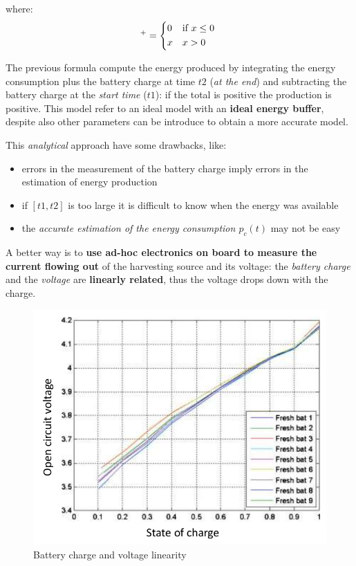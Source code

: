 \documentclass[10pt,a4paper]{report}
\theoremstyle{definition}
\begin{document}
where:
\begin{equation}
	[x]^{+} =
	\begin{cases*}
		0 & if $x \leq 0$ \\
		x        & $x > 0$
	\end{cases*}
\end{equation}

The previous formula compute the energy produced by integrating the energy consumption plus the battery charge at time $t2$ (\textit{at the end}) and subtracting the battery charge at the \textit{start time} ($t1$): if the total is positive the production is positive.
This model refer to an ideal model with an \textbf{ideal energy buffer}, despite also other parameters can be introduce to obtain a more  accurate model.

This \textit{analytical} approach have some drawbacks, like:
\begin{itemize}
	\item 
	errors in the measurement of the battery charge imply errors in the estimation of energy production
	\item 
	if $[t1,t2]$ is too large it is difficult to know when the energy was available
	\item 
	the \textit{accurate estimation of the energy consumption $p_{c}(t)$} may not be easy
\end{itemize}

A better way is to \textbf{use ad-hoc electronics on board to measure the current flowing out} of the harvesting source and its voltage: the \textit{battery charge} and the \textit{voltage} are \textbf{linearly related}, thus the voltage drops down with the charge.
\begin{figure}[h!]
	\centering\includegraphics[scale=0.25]{images/Pasted image 20230506091322.png}
	\caption{Battery charge and voltage linearity}
\end{figure}
\end{document}
